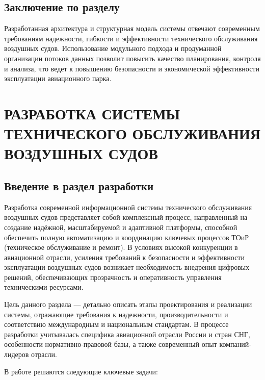 \documentclass[14pt,a4paper]{extarticle}
\begin{document}
\subsection{Заключение по разделу}

Разработанная архитектура и структурная модель системы отвечают современным требованиям надежности, гибкости и эффективности технического обслуживания воздушных судов. Использование модульного подхода и продуманной организации потоков данных позволит повысить качество планирования, контроля и анализа, что ведет к повышению безопасности и экономической эффективности эксплуатации авиационного парка.

\newpage


\section{РАЗРАБОТКА СИСТЕМЫ ТЕХНИЧЕСКОГО ОБСЛУЖИВАНИЯ ВОЗДУШНЫХ СУДОВ}

\subsection{Введение в раздел разработки}

Разработка современной информационной системы технического обслуживания воздушных судов представляет собой комплексный процесс, направленный на создание надёжной, масштабируемой и адаптивной платформы, способной обеспечить полную автоматизацию и координацию ключевых процессов ТОиР (техническое обслуживание и ремонт). В условиях высокой конкуренции в авиационной отрасли, усиления требований к безопасности и эффективности эксплуатации воздушных судов возникает необходимость внедрения цифровых решений, обеспечивающих прозрачность и оперативность управления техническими ресурсами.

Цель данного раздела — детально описать этапы проектирования и реализации системы, отражающие требования к надежности, производительности и соответствию международным и национальным стандартам. В процессе разработки учитывалась специфика авиационной отрасли России и стран СНГ, особенности нормативно-правовой базы, а также современный опыт компаний-лидеров отрасли.

В работе решаются следующие ключевые задачи:
\end{document}

